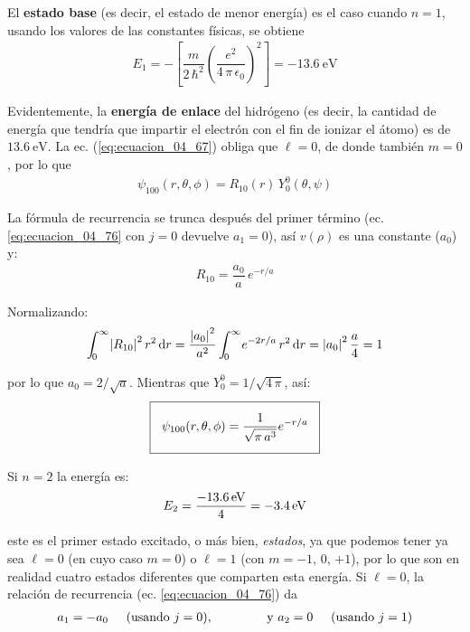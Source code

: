 El \textbf{estado base} (es decir, el estado de menor energía) es el caso cuando $n = 1$, usando los valores de las constantes físicas, se obtiene
\begin{align}
E_{1} = - \left[ \dfrac{m}{2 \, \hbar^{2}} \left( \dfrac{e^{2}}{4 \, \pi \, \epsilon_{0}} \right)^{2} \right] =  \SI{-13.6}{\electronvolt}
\label{eq:ecuacion_04_77}
\end{align}

Evidentemente, la \textbf{energía de enlace} del hidrógeno (es decir, la cantidad de energía que tendría que impartir el electrón con el fin de ionizar el átomo) es de $\SI{13.6}{\electronvolt}$. La ec. (\ref{eq:ecuacion_04_67}) obliga que $\ell = 0$, de donde también $m = 0$, por lo que
\begin{align}
\psi_{100} (r, \theta, \phi) = R_{10}(r) \, Y_{0}^{0} (\theta, \psi)
\label{eq:ecuacion_04_78}
\end{align}

La fórmula de recurrencia se trunca después del primer término (ec. \ref{eq:ecuacion_04_76} con $j=0$ devuelve $a_{1} = 0$), así $v(\rho)$ es una constante ($a_{0}$) y:
\begin{align}
R_{10} = \dfrac{a_{0}}{a} \, e^{-r/a}
\label{eq:ecuacion_04_79}
\end{align}

Normalizando:
\begin{align*}
\scaleint{5ex}_{\bs 0}^{\infty} \abs{R_{10}}^{2} \, r^{2} \dd{r} = \dfrac{\abs{a_{0}}^{2}}{a^{2}} \, \scaleint{5ex}_{\bs 0}^{\infty} e^{-2r/a} \, r^{2} \dd{r} =  \abs{a_{0}}^{2} \, \dfrac{a}{4} =  1
\end{align*}

por lo que $a_{0} = 2 / \sqrt{a}$. Mientras que $Y_{0}^{0} = 1 / \sqrt{4 \, \pi}$, así:
\begin{align}
\setlength{\fboxsep}{3\fboxsep}\boxed{
\psi_{100} (r, \theta, \phi) = \dfrac{1}{\sqrt{\pi \, a^{3}}} e^{-r/a}}
\label{eq:ecuacion_04_80}
\end{align}

Si $n = 2$ la energía es:
\begin{align}
E_{2} = \dfrac{\SI{-13.6}{\electronvolt}}{4} =  \SI{- 3.4}{\electronvolt}
\label{eq:ecuacion_04_81}
\end{align}

este es el primer estado excitado, o más bien, \textit{estados}, ya que podemos tener ya sea $\ell = 0$ (en cuyo caso $m = 0$) o $\ell = 1$ (con $m = -1$, $0$, $+ 1$), por lo que son en realidad cuatro estados diferentes que comparten esta energía. Si $\ell = 0$, la relación de recurrencia (ec. \ref{eq:ecuacion_04_76}) da
\begin{align*}
a_{1} = - a_{0} \hspace{0.5cm} \text{(usando } j = 0 \text{)}, \hspace{1.5cm} \text{y } a_{2} = 0 \hspace{0.5cm} \text{(usando } j = 1 \text{)}
\end{align*}

